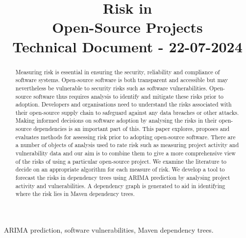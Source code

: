 \documentclass[conference]{IEEEtran}
\begin{document}
\title{Risk in \\Open-Source Projects\\
{\footnotesize Technical Document - 22-07-2024}
}

\author{
\and
{}
    }

\maketitle
\thispagestyle{plain}
\pagestyle{plain}

\begin{abstract}
Measuring risk is essential in ensuring the security, reliability and compliance of software systems. Open-source software is both transparent and accessible but may nevertheless be vulnerable to security risks such as software vulnerabilities. Open-source software thus requires analysis to identify and mitigate these risks prior to adoption. Developers and organisations need to understand the risks associated with their open-source supply chain to safeguard against any data breaches or other attacks. Making informed decisions on software adoption by analysing the risks in their open-source dependencies is an important part of this. This paper explores, proposes and evaluates methods for assessing risk prior to adopting open-source software. There are a number of objects of analysis used to rate risk such as measuring project activity and vulnerability data and our aim is to combine them to give a more comprehensive view of the risks of using a particular open-source project. We examine the literature to decide on an appropriate algorithm for each measure of risk. We develop a tool to forecast the risks in dependency trees using ARIMA prediction by analysing project activity and vulnerabilities. A dependency graph is generated to aid in identifying where the risk lies in Maven dependency trees. 
\end{abstract}

\begin{IEEEkeywords}
ARIMA prediction, software vulnerabilities, Maven dependency trees.
\end{IEEEkeywords}
\end{document}
